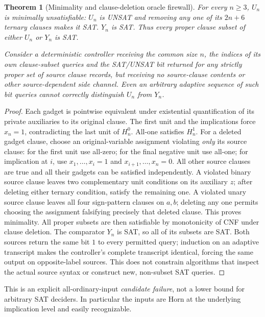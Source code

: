 \documentclass[11pt]{article}
\newtheorem{theorem}{Theorem}
\begin{document}
\begin{theorem}[Minimality and clause-deletion oracle firewall]
For every $n\ge3$, $U_n$ is minimally unsatisfiable: $U_n$ is UNSAT and removing any one of its $2n+6$ ternary clauses makes it SAT. $Y_n$ is SAT. Thus every proper clause subset of \emph{either} $U_n$ or $Y_n$ is SAT.

Consider a deterministic controller receiving the common size $n$, the indices of its own clause-subset queries and the SAT/UNSAT bit returned for any strictly proper set of source clause records, but receiving no source-clause contents or other source-dependent side channel. Even an arbitrary adaptive sequence of such bit queries cannot correctly distinguish $U_n$ from $Y_n$.
\end{theorem}
\begin{proof}
Each gadget is pointwise equivalent under existential quantification of its private auxiliaries to its original clause. The first unit and the implications force $x_n=1$, contradicting the last unit of $H_n^0$. All-one satisfies $H_n^1$. For a deleted gadget clause, choose an original-variable assignment violating \emph{only} its source clause: for the first unit use all-zero; for the final negative unit use all-one; for implication at $i$, use $x_1,\ldots,x_i=1$ and $x_{i+1},\ldots,x_n=0$. All other source clauses are true and all their gadgets can be satisfied independently. A violated binary source clause leaves two complementary unit conditions on its auxiliary $z$; after deleting either ternary condition, satisfy the remaining one. A violated unary source clause leaves all four sign-pattern clauses on $a,b$; deleting any one permits choosing the assignment falsifying precisely that deleted clause. This proves minimality. All proper subsets are then satisfiable by monotonicity of CNF under clause deletion. The comparator $Y_n$ is SAT, so all of its subsets are SAT. Both sources return the same bit $1$ to every permitted query; induction on an adaptive transcript makes the controller's complete transcript identical, forcing the same output on opposite-label sources. This does not constrain algorithms that inspect the actual source syntax or construct new, non-subset SAT queries.
\end{proof}

This is an explicit all-ordinary-input \emph{candidate failure}, not a lower bound for arbitrary SAT deciders. In particular the inputs are Horn at the underlying implication level and easily recognizable.
\end{document}
